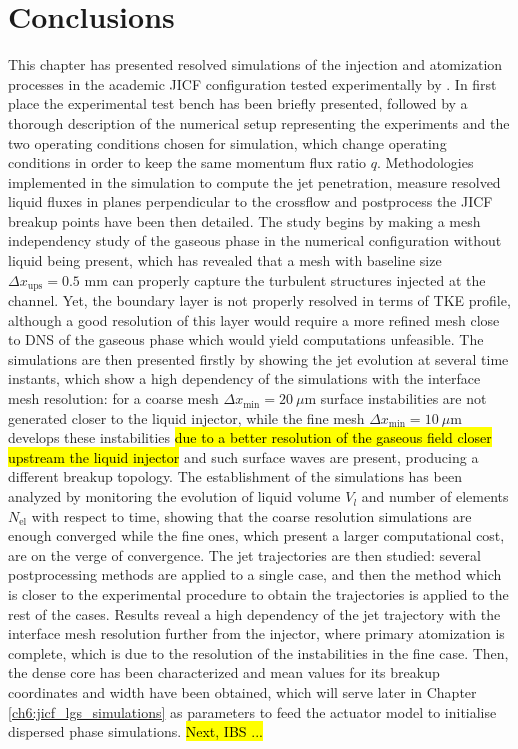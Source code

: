 \clearpage

\section{Conclusions}

This chapter has presented resolved simulations of the injection and atomization processes in the academic JICF configuration tested experimentally by . In first place the experimental test bench has been briefly presented, followed by a thorough description of the numerical setup representing the experiments and the two operating conditions chosen for simulation, which change operating conditions in order to keep the same momentum flux ratio $q$. Methodologies implemented in the simulation to compute the jet penetration, measure resolved liquid fluxes in planes perpendicular to the crossflow and postprocess the JICF breakup points have been then detailed. The study begins by making a mesh independency study of the gaseous phase in the numerical configuration without liquid being present, which has revealed that a mesh with baseline size $\Delta x_\mathrm{ups} = 0.5$ mm can properly capture the turbulent structures injected at the channel. Yet, the boundary layer is not properly resolved in terms of TKE profile, although a good resolution of this layer would require a more refined mesh close to DNS of the gaseous phase which would yield computations unfeasible. The simulations are then presented firstly by showing the jet evolution at several time instants, which show a high dependency of the simulations with the interface mesh resolution: for a coarse mesh $\Delta x_\mathrm{min} = 20~\mu$m surface instabilities are not generated closer to the liquid injector, while the fine mesh $\Delta x_\mathrm{min} = 10~\mu$m develops these instabilities \hl{due to a better resolution of the gaseous field closer upstream the liquid injector} and such surface waves are present, producing a different breakup topology. The establishment of the simulations has been analyzed by monitoring the evolution of liquid volume $V_l$ and number of elements $N_\mathrm{el}$ with respect to time, showing that the coarse resolution simulations are enough converged while the fine ones, which present a larger computational cost, are on the verge of convergence. The jet trajectories are then studied: several postprocessing methods are applied to a single case, and then the method which is closer to the experimental procedure to obtain the trajectories is applied to the rest of the cases. Results reveal a high dependency of the jet trajectory with the interface mesh resolution further from the injector, where primary atomization is complete, which is due to the resolution of the instabilities in the fine case. Then, the dense core has been characterized and mean values for its breakup coordinates and width have been obtained, which will serve later in Chapter \ref{ch6:jicf_lgs_simulations} as parameters to feed the actuator model to initialise dispersed phase simulations. \hl{Next, IBS ...}

